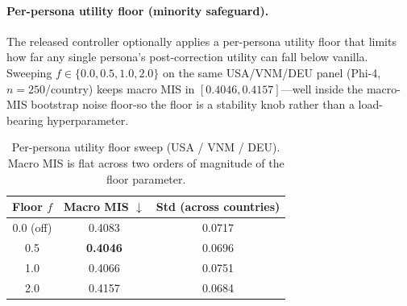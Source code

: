\documentclass{article}
\begin{document}
\paragraph{Per-persona utility floor (minority safeguard).}
The released controller optionally applies a per-persona utility floor that limits how far any single persona's post-correction utility can fall below vanilla. Sweeping $f \in \{0.0, 0.5, 1.0, 2.0\}$ on the same USA/VNM/DEU panel (Phi-4, $n{=}250$/country) keeps macro MIS in $[0.4046, 0.4157]$—well inside the macro-MIS bootstrap noise floor-so the floor is a stability knob rather than a load-bearing hyperparameter.

\begin{table}[H]\centering\small
\caption{Per-persona utility floor sweep (USA / VNM / DEU). Macro MIS is flat across two orders of magnitude of the floor parameter.}
\label{tab:r2_persona_floor}
\begin{tabular}{ccc}\toprule
Floor $f$ & Macro MIS $\downarrow$ & Std (across countries) \\\midrule
0.0 (off) & 0.4083 & 0.0717 \\
0.5       & \textbf{0.4046} & 0.0696 \\
1.0       & 0.4066 & 0.0751 \\
2.0       & 0.4157 & 0.0684 \\
\bottomrule
\end{tabular}
\end{table}



\end{document}
